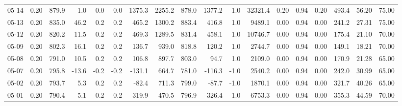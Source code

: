 \begin{threeparttable}
{\begin{tabular}{lrrrrrrrrrrrrrrrrr}
  05-14 &     0.20 & 879.9 &               1.0 &               0.0 &                0.0 &             1375.3 & 2255.2 & 878.0 &     1377.2 &                      1.0 &             32321.4 &       0.20 &      0.94 &           0.20 &            493.4 &           56.20 &                  75.00 \\
  05-13 &     0.20 & 835.0 &              46.2 &               0.2 &                0.2 &              465.2 & 1300.2 & 883.4 &      416.8 &                      1.0 &              9489.1 &       0.00 &      0.94 &           0.00 &            241.2 &           27.31 &                  75.00 \\
  05-12 &     0.20 & 820.2 &              11.5 &               0.2 &                0.2 &              469.3 & 1289.5 & 831.4 &      458.1 &                      1.0 &             10746.7 &       0.00 &      0.94 &           0.00 &            175.4 &           21.10 &                  70.00 \\
  05-09 &     0.20 & 802.3 &              16.1 &               0.2 &                0.2 &              136.7 &  939.0 & 818.8 &      120.2 &                      1.0 &              2744.7 &       0.00 &      0.94 &           0.00 &            149.1 &           18.21 &                  70.00 \\
  05-08 &     0.20 & 791.0 &              10.5 &               0.2 &                0.2 &              106.8 &  897.7 & 803.0 &       94.7 &                      1.0 &              2109.0 &       0.00 &      0.94 &           0.00 &            170.9 &           21.28 &                  65.00 \\
  05-07 &     0.20 & 795.8 &             -13.6 &              -0.2 &               -0.2 &             -131.1 &  664.7 & 781.0 &     -116.3 &                     -1.0 &              2540.2 &       0.00 &      0.94 &           0.00 &            242.0 &           30.99 &                  65.00 \\
  05-02 &     0.20 & 793.7 &               5.3 &               0.2 &                0.2 &              -82.4 &  711.3 & 799.0 &      -87.7 &                     -1.0 &              1870.1 &       0.00 &      0.94 &           0.00 &            321.7 &           40.26 &                  65.00 \\
  05-01 &     0.20 & 790.4 &               5.1 &               0.2 &                0.2 &             -319.9 &  470.5 & 796.9 &     -326.4 &                     -1.0 &              6753.3 &       0.00 &      0.94 &           0.00 &            355.3 &           44.59 &                  70.00 \\

\end{tabular}}
\end{threeparttable}
